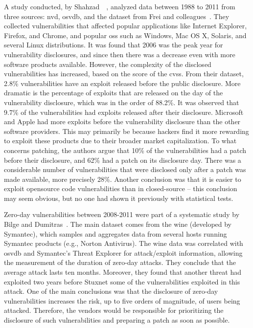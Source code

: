 A study conducted, by Shahzad~\etal{}~\cite{Shahzad:2012}, analyzed data between 1988 to 2011 from three sources: \gls{nvd}, \gls{osvdb}, and the dataset from Frei and colleagues~\cite{Frei:2006}.
They collected vulnerabilities that affected popular applications like Internet Explorer, Firefox, and Chrome, and popular \glspl{os} such as Windows, Mac OS X, Solaris, and several Linux distributions. 
It was found that 2006 was the peak year for vulnerability disclosures, and since then there was a decrease even with more software products available. 
However, the complexity of the disclosed vulnerabilities has increased, based on the score of the \gls{cvss}. 
From their dataset, 2.8\% vulnerabilities have an exploit released before the public disclosure. 
More dramatic is the percentage of exploits that are released on the day of the vulnerability disclosure, which was in the order of 88.2\%. 
It was observed that 9.7\% of the vulnerabilities had exploits released after their disclosure.
Microsoft and Apple had more exploits before the vulnerability disclosure than the other software providers. 
This may primarily be because hackers find it more rewarding to exploit these products due to their broader market capitalization.
To what concerns patching, the authors argue that 10\% of the vulnerabilities had a patch before their disclosure, and 62\% had a patch on its disclosure day. 
There was a considerable number of vulnerabilities that were disclosed only after a patch was made available, more precisely 28\%. 
Another conclusion was that it is easier to exploit opensource code vulnerabilities than in closed-source – this conclusion may seem obvious, but no one had shown it previously with statistical tests.

Zero-day vulnerabilities between 2008-2011 were part of a systematic study by Bilge and Dumitras~\cite{Bilge:2012}.
The main dataset comes from the \gls{wine} (developed by Symantec), which samples and aggregates data from several hosts running Symantec products (e.g., Norton Antivirus).
The \gls{wine} data was correlated with \gls{osvdb} and Symantec's Threat Explorer for attack/exploit information, allowing the measurement of the duration of zero-day attacks.
They conclude that the average attack lasts ten months. 
Moreover, they found that another threat had exploited two years before Stuxnet some of the vulnerabilities exploited in this attack.
One of the main conclusions was that the disclosure of zero-day vulnerabilities increases the risk, up to five orders of magnitude, of users being attacked.
Therefore, the vendors would be responsible for prioritizing the disclosure of such vulnerabilities and preparing a patch as soon as possible. 


